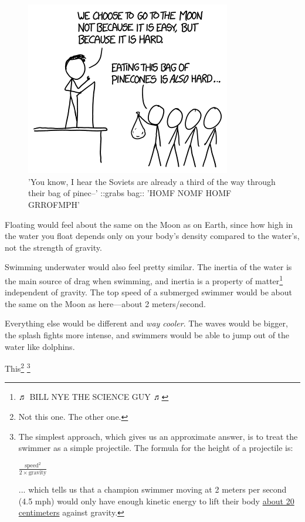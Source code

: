 {\begin{figure}[!htbp]
\centering
\includegraphics[scale=0.5, max width=0.8\textwidth]{imgs/a/124/kennedy.png}
\caption{'You know, I hear the Soviets are already a third of the way through their bag of pinec--' ::grabs bag:: 'HOMF NOMF HOMF GRROFMPH'}
\end{figure}

{Floating would feel about the same on the Moon as on Earth, since how high in the water you float depends only on your body's density compared to the water's, not the strength of gravity.}

{Swimming underwater would also feel pretty similar. The inertia of the water is the main source of drag when swimming, and inertia is a property of matter{\footnote{♬ BILL NYE THE SCIENCE GUY ♬} } independent of gravity. The top speed of a submerged swimmer would be about the same on the Moon as here—about 2 meters/second.}

{Everything else would be different and \emph{way cooler}. The waves would be bigger, the splash fights more intense, and swimmers would be able to jump out of the water like dolphins.}

{This{\footnote{Not this one. The other one.} } ​{\footnote{The simplest approach, which gives us an approximate answer, is to treat the swimmer as a simple projectile. The formula for the height of a projectile is:

\(\frac{\text{speed}^2}{2\times\text{gravity}}\)

... which tells us that a champion swimmer moving at 2 meters per second (4.5 mph) would only have enough kinetic energy to lift their body \href{http://www.wolframalpha.com/input/?i=\%282+m\%2Fs\%29\%5E2+\%2F+\%282+*+earth+gravity\%29}{about 20 centimeters} against gravity.

}}}}
